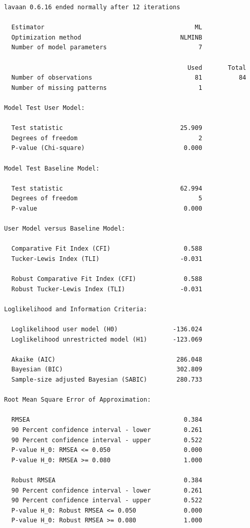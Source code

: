\documentclass[
  11pt,
]{book}
\begin{document}
\begin{verbatim}
lavaan 0.6.16 ended normally after 12 iterations

  Estimator                                         ML
  Optimization method                           NLMINB
  Number of model parameters                         7

                                                  Used       Total
  Number of observations                            81          84
  Number of missing patterns                         1            

Model Test User Model:
                                                      
  Test statistic                                25.909
  Degrees of freedom                                 2
  P-value (Chi-square)                           0.000

Model Test Baseline Model:

  Test statistic                                62.994
  Degrees of freedom                                 5
  P-value                                        0.000

User Model versus Baseline Model:

  Comparative Fit Index (CFI)                    0.588
  Tucker-Lewis Index (TLI)                      -0.031
                                                      
  Robust Comparative Fit Index (CFI)             0.588
  Robust Tucker-Lewis Index (TLI)               -0.031

Loglikelihood and Information Criteria:

  Loglikelihood user model (H0)               -136.024
  Loglikelihood unrestricted model (H1)       -123.069
                                                      
  Akaike (AIC)                                 286.048
  Bayesian (BIC)                               302.809
  Sample-size adjusted Bayesian (SABIC)        280.733

Root Mean Square Error of Approximation:

  RMSEA                                          0.384
  90 Percent confidence interval - lower         0.261
  90 Percent confidence interval - upper         0.522
  P-value H_0: RMSEA <= 0.050                    0.000
  P-value H_0: RMSEA >= 0.080                    1.000
                                                      
  Robust RMSEA                                   0.384
  90 Percent confidence interval - lower         0.261
  90 Percent confidence interval - upper         0.522
  P-value H_0: Robust RMSEA <= 0.050             0.000
  P-value H_0: Robust RMSEA >= 0.080             1.000


\end{verbatim}
\end{document}
